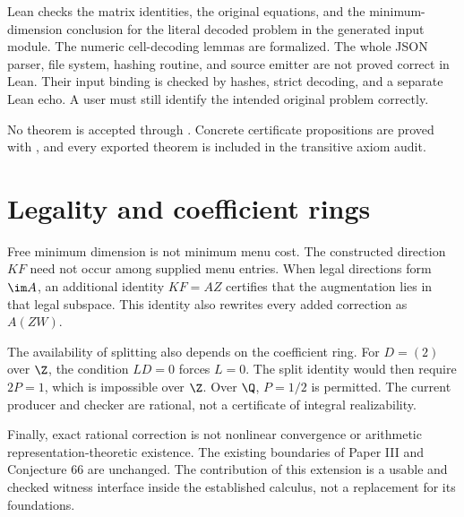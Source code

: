 \begin{scopebox}[title=The precise trust boundary]
Lean checks the matrix identities, the original equations, and the minimum-dimension conclusion for the literal decoded problem in the generated input module. The numeric cell-decoding lemmas are formalized. The whole JSON parser, file system, hashing routine, and source emitter are not proved correct in Lean. Their input binding is checked by hashes, strict decoding, and a separate Lean echo. A user must still identify the intended original problem correctly.

No theorem is accepted through . Concrete certificate propositions are proved with , and every exported theorem is included in the transitive axiom audit.
\end{scopebox}

\section{Legality and coefficient rings}
Free minimum dimension is not minimum menu cost. The constructed direction $KF$ need not occur among supplied menu entries. When legal directions form $\im A$, an additional identity $KF=AZ$ certifies that the augmentation lies in that legal subspace. This identity also rewrites every added correction as $A(ZW)$.

The availability of splitting also depends on the coefficient ring. For $D=(2)$ over $\Z$, the condition $LD=0$ forces $L=0$. The split identity would then require $2P=1$, which is impossible over $\Z$. Over $\Q$, $P=1/2$ is permitted. The current producer and checker are rational, not a certificate of integral realizability.

Finally, exact rational correction is not nonlinear convergence or arithmetic representation-theoretic existence. The existing boundaries of Paper III and Conjecture 66 are unchanged. The contribution of this extension is a usable and checked witness interface inside the established calculus, not a replacement for its foundations.
